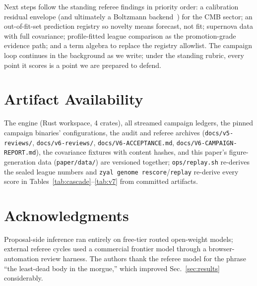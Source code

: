 \documentclass[journal]{IEEEtran}
\begin{document}
Next steps follow the standing referee findings in priority order: a calibration
residual envelope (and ultimately a Boltzmann backend~\cite{class2011,hiclass2017})
for the CMB sector; an out-of-fit-set prediction registry so novelty means forecast,
not fit; supernova data with full covariance; profile-fitted league comparison as the
promotion-grade evidence path; and a term algebra to replace the registry allowlist. The
campaign loop continues in the background as we write; under the standing rubric, every
point it scores is a point we are prepared to defend.

\section*{Artifact Availability}
The engine (Rust workspace, 4 crates), all streamed campaign ledgers, the pinned
campaign binaries' configurations, the audit and referee archives
(\texttt{docs/v5-reviews/}, \texttt{docs/v6-reviews/}, \texttt{docs/V6-ACCEPTANCE.md},
\texttt{docs/V6-CAMPAIGN-REPORT.md}), the covariance fixtures with content hashes, and
this paper's figure-generation data (\texttt{paper/data/}) are versioned together;
\texttt{ops/replay.sh} re-derives the sealed league numbers and
\texttt{zyal genome rescore}/\texttt{replay} re-derive every score in
Tables~\ref{tab:cascade}--\ref{tab:v7} from committed artifacts.

\section*{Acknowledgments}
Proposal-side inference ran entirely on free-tier routed open-weight models; external
referee cycles used a commercial frontier model through a browser-automation review
harness. The authors thank the referee model for the phrase ``the least-dead body in
the morgue,'' which improved Sec.~\ref{sec:results} considerably.



\end{document}
